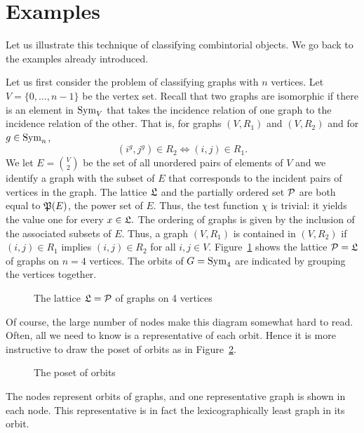 
\section{Examples}
\label{sec:examples}

Let us illustrate this technique of classifying combintorial objects. 
We go back to the examples already introduced.

\bigskip

Let us first consider the problem of classifying graphs with $n$ vertices. 
Let 
$V = \{0,\ldots,n-1\}$ be the vertex set. 
Recall that two graphs are isomorphic if there is an element in ${\rm Sym}_V$ that takes 
the incidence relation of one graph to the incidence relation of the other.
That is, for graphs $(V,R_1)$ and $(V,R_2)$ and for $g \in {\rm Sym}_n$, 
$$
(i^g,j^g) \in R_2 \iff (i,j) \in R_1.
$$
We let $E = {V \choose 2}$ be the set of all unordered pairs of elements of $V$ 
and we identify a graph with the subset of $E$ 
that corresponds to the incident pairs of vertices in the graph.
The lattice ${\mathfrak L}$ and the partially ordered set ${\cal P}$ are both equal to ${\mathfrak P}(E)$, the power set of $E$.
Thus, the test function $\chi$ is trivial: it yields the value one for every $x\in {\mathfrak L}.$
The ordering of graphs is given by the inclusion of the associated subsets of $E$.
Thus, 
a graph $(V,R_1)$ is contained in $(V,R_2)$ if $(i,j) \in R_1$ implies 
$(i,j) \in R_2$ for all $i,j \in V$.
Figure~\ref{g4full} shows the lattice  ${\cal P}={\mathfrak L}$ of graphs on  
$n=4$ vertices. 
The orbits of $G = {\rm Sym}_4$ are indicated by grouping the vertices together. 
\begin{figure}
\begin{center}
 
\end{center}
\caption{\label{g4full}The lattice ${\mathfrak L}= {\cal P}$ of graphs on 4 vertices}
\end{figure}
Of course, the large number of nodes make this diagram somewhat hard to read.
Often, all we need to know is a representative of each orbit. 
Hence it is more instructive to draw the poset of orbits as in Figure~\ref{g4poset}.
\begin{figure}
\begin{center}
 
\end{center}
\caption{\label{g4poset}The poset of orbits}
\end{figure}
The nodes represent orbits of graphs, and one representative graph is shown in each node. 
This representative is in fact the lexicographically least graph in its orbit.


